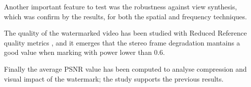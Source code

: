 \begin{table}[htbp]
 
 \begin{center}
 \caption{\label{tab:}}
 \end{center}
 \end{table}
 \begin{table}[htbp]
 \begin{center}
 \caption{\label{tab:}}
 \end{center}
 \end{table}

Another important feature to test was the robustness against view synthesis, which was confirm by the results, for both the spatial and frequency techniques.

The quality of the watermarked video has been studied with Reduced Reference quality metrics \cite{QMETRICS}, and it emerges that the stereo frame degradation mantains a good value when marking with power lower than 0.6. 

Finally the average PSNR value has been computed to analyse compression and visual impact of the watermark; the study supports the previous results. 


